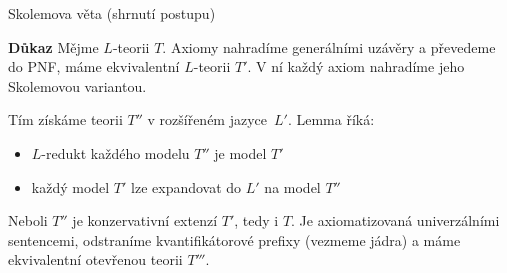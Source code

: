 \documentclass{beamer}
\begin{document}
\begin{frame}{Skolemova věta (shrnutí postupu)}


    \textbf{Důkaz} Mějme $L$-teorii $T$. Axiomy nahradíme generálními uzávěry a převedeme do PNF, máme ekvivalentní $L$-teorii $T'$. V ní každý axiom nahradíme jeho Skolemovou variantou. 
    
    Tím získáme teorii $T''$ v rozšířeném jazyce~$L'$. Lemma říká:
    \begin{itemize}
        \item $L$-redukt každého modelu $T''$ je model $T'$
        \item každý model $T'$ lze expandovat do $L'$ na model $T''$
       \end{itemize}
    Neboli $T''$ je konzervativní extenzí $T'$, tedy i $T$. Je axiomatizovaná  univerzálními sentencemi, odstraníme kvantifikátorové prefixy (vezmeme jádra) a máme ekvivalentní otevřenou teorii $T'''$.    
    \hfill\qedsymbol

    \medskip


\end{frame}
\end{document}
